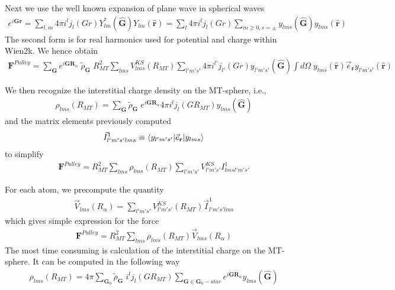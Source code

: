 \documentclass[aps,prb,floatfix,epsfig,singlecolumn,showpacs,preprintnumbers]{revtex4}
\newcommand{\vR}{{\mathbf{R}}}
\newcommand{\vF}{{\mathbf{F}}}
\renewcommand{\vr}{{\mathbf{r}}}
\newcommand{\vG}{{\mathbf{G}}}
\begin{document}
Next we use the well known expansion of plane wave in spherical waves
\begin{eqnarray}
e^{i\vG\vr} = \sum_{l,m} 4\pi i^l j_l(G r) Y_{lm}^*(\hat{\vG})  Y_{lm}(\hat{\vr})=
\sum_l 4\pi i^l j_l(G r) \sum_{m\ge 0,s=\pm} y_{lm s}(\hat{\vG}) y_{lms}(\hat{\vr})
\end{eqnarray}
The second form is for real harmonics used for potential and charge
within Wien2k.
We hence obtain
\begin{eqnarray}
\vF^{Pulley} =\sum_\vG 
e^{i\vG\vR_\alpha} \; \widetilde{\rho}_{\vG} \;{R_{MT}^2} \sum_{lms}  V^{KS}_{lms}(R_{MT})  
\sum_{l'm's'} 4\pi i^{l'} j_{l'}(G r) y_{l'm' s'}(\hat{\vG}) 
\int d\Omega\; y_{lms}(\hat{\vr}) \vec{e}_\vr  y_{l'm's'}(\hat{\vr})
\end{eqnarray}

We then recognize the interstitial charge density on the MT-sphere, i.e.,
\begin{eqnarray}
\rho_{lms}(R_{MT}) = \sum_\vG \widetilde{\rho}_{\vG} \;  e^{i\vG\vR_\alpha} 
4\pi i^l j_l(GR_{MT}) y_{lms}(\hat{\vG})
\label{Eq:405}
\end{eqnarray}
and the matrix elements previously computed 
\begin{eqnarray}
\vec{I}^{1}_{l'm's'lms}\equiv \braket{y_{l'm's'}|\vec{e}_\vr|y_{lms}}
\end{eqnarray}
to simplify
\begin{eqnarray}
\vF^{Pulley} =R_{MT}^2 \sum_{lms} \rho_{lms}(R_{MT}) \sum_{l'm's'} V^{KS}_{l'm's'} I^1_{lmsl'm's'}
\end{eqnarray}

For each atom, we precompute the quantity
\begin{eqnarray}
\vec{V}_{lms}(R_\alpha) =\sum_{l'm's'} V^{KS}_{l'm's'}(R_{MT})  \vec{I}^{1}_{l'm's' lms} 
\end{eqnarray}
which gives simple expression for the force
\begin{eqnarray}
\vF^{Pulley} =R_{MT}^2 \sum_{lms} \rho_{lms}(R_{MT}) \vec{V}_{lms}(R_\alpha)
\label{Eq:412}
\end{eqnarray}
The most time consuming is calculation of the interstitial charge on
the MT-sphere. It can be computed in the following way
\begin{eqnarray}
\rho_{lms}(R_{MT}) = 4\pi \sum_{\vG_0} \widetilde{\rho}_{\vG} \; 
i^l j_l(GR_{MT}) 
\sum_{\vG\in \vG_0-star} e^{i\vG\vR_\alpha} 
y_{lms}(\hat{\vG})
\end{eqnarray}
\end{document}

